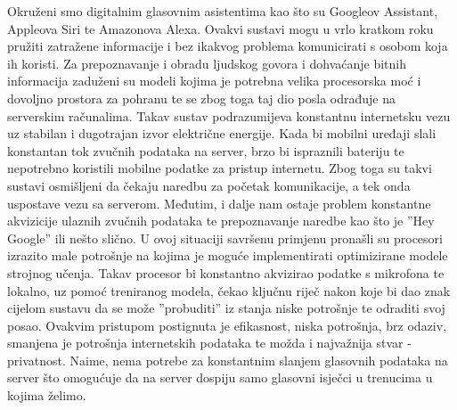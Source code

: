 Okruženi smo digitalnim glasovnim asistentima kao što su Googleov Assistant,
Appleova Siri te Amazonova Alexa. Ovakvi sustavi mogu u vrlo kratkom
roku pružiti zatražene informacije i bez ikakvog problema komunicirati s osobom
koja ih koristi. Za prepoznavanje i obradu ljudskog govora i dohvaćanje bitnih
informacija zaduženi su modeli kojima je potrebna velika procesorska moć i dovoljno
prostora za pohranu te se zbog toga taj dio posla odrađuje na serverskim računalima.
Takav sustav podrazumijeva konstantnu internetsku vezu uz stabilan i dugotrajan
izvor električne energije. Kada bi mobilni uređaji slali konstantan tok zvučnih podataka
na server, brzo bi ispraznili bateriju te nepotrebno koristili mobilne podatke za
pristup internetu. Zbog toga su takvi sustavi osmišljeni da čekaju naredbu za
početak komunikacije, a tek onda uspostave vezu sa serverom. Međutim, i dalje
nam ostaje problem konstantne akvizicije ulaznih zvučnih podataka te prepoznavanje
naredbe kao što je ”Hey Google” ili nešto slično. U ovoj situaciji savršenu primjenu
pronašli su procesori izrazito male potrošnje na kojima je moguće implementirati
optimizirane modele strojnog učenja. Takav procesor bi konstantno akvizirao podatke
s mikrofona te lokalno, uz pomoć treniranog modela, čekao ključnu riječ nakon
koje bi dao znak cijelom sustavu da se može ”probuditi” iz stanja niske
potrošnje te odraditi svoj posao. Ovakvim pristupom postignuta je efikasnost, niska
potrošnja, brz odaziv, smanjena je potrošnja internetskih podataka te možda i
najvažnija stvar - privatnost. Naime, nema potrebe za konstantnim slanjem glasovnih
podataka na server što omogućuje da na server dospiju samo glasovni isječci u
trenucima u kojima želimo.
